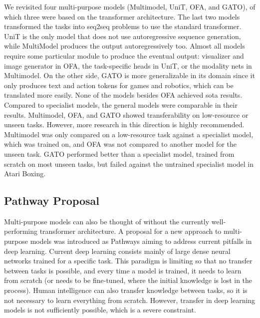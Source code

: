 \documentclass[
]{krantz}
\begin{document}
We revisited four multi-purpose models (Multimodel, UniT, OFA, and GATO), of which three were based on the transformer architecture. The last two models transformed the tasks into seq2seq problems to use the standard transformer. UniT is the only model that does not use autoregressive sequence generation, while MultiModel produces the output autoregressively too.
Almost all models require some particular module to produce the eventual output: visualizer and image generator in OFA, the task-specific heads in UniT, or the modality nets in Multimodel. On the other side, GATO is more generalizable in its domain since it only produces text and action tokens for games and robotics, which can be translated more easily.
None of the models besides OFA achieved sota results. Compared to specialist models, the general models were comparable in their results. Multimodel, OFA, and GATO showed transferability on low-resource or unseen tasks. However, more research in this direction is highly recommended. Multimodel was only compared on a low-resource task against a specialist model, which was trained on, and OFA was not compared to another model for the unseen task. GATO performed better than a specialist model, trained from scratch on most unseen tasks, but failed against the untrained specialist model in Atari Boxing.

\hypertarget{pathway-proposal}{%
\subsection{Pathway Proposal}\label{pathway-proposal}}

Multi-purpose models can also be thought of without the currently well-performing transformer architecture. A proposal for a new approach to multi-purpose models was introduced as Pathways \citep{Dean21} aiming to address current pitfalls in deep learning. Current deep learning consists mainly of large dense neural networks trained for a specific task. This paradigm is limiting so that no transfer between tasks is possible, and every time a model is trained, it needs to learn from scratch (or needs to be fine-tuned, where the initial knowledge is lost in the process). Human intelligence can also transfer knowledge between tasks, so it is not necessary to learn everything from scratch. However, transfer in deep learning models is not sufficiently possible, which is a severe constraint.
\end{document}
